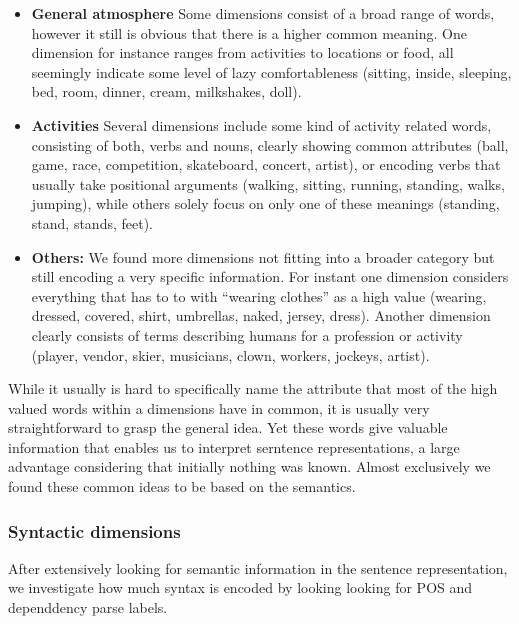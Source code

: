 \begin{itemize}
\item \textbf{General atmosphere} Some dimensions consist of a broad range of words, however it still is obvious that there is a higher common meaning.  One dimension for instance ranges from activities to locations or food, all seemingly indicate some level of lazy comfortableness (sitting, inside, sleeping, bed, room, dinner, cream, milkshakes, doll).
\item \textbf{Activities} Several dimensions include some kind of activity related words, consisting of both, verbs and nouns, clearly showing common attributes (ball, game, race, competition, skateboard, concert, artist), or encoding verbs that usually take positional arguments (walking, sitting, running, standing, walks, jumping), while others solely focus on only one of these meanings (standing, stand, stands, feet).
\item \textbf{Others:} We found more dimensions not fitting into a broader category but still encoding a very specific information. For instant one dimension considers everything that has to to with ``wearing clothes'' as a high value (wearing, dressed, covered, shirt, umbrellas, naked, jersey, dress). Another dimension clearly consists of terms describing humans for a profession or activity (player, vendor, skier, musicians, clown, workers, jockeys, artist).
\end{itemize}

\noindent
While it usually is hard to specifically name the attribute that most of the high valued words within a dimensions have in common, it is usually very straightforward to grasp the general idea. Yet these words give valuable information that enables us to interpret serntence representations, a large advantage considering that initially nothing was known. Almost exclusively we found these common ideas to be based on the semantics.

\subsubsection{Syntactic dimensions}
After extensively looking for semantic information in the sentence representation, we investigate how much syntax is encoded by looking looking for \ac{POS} and dependdency parse labels.

